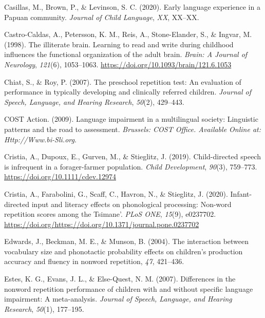 \documentclass[english,,man,floatsintext]{apa6}
\begin{document}
\leavevmode\hypertarget{ref-casillas2020early}{}%
Casillas, M., Brown, P., \& Levinson, S. C. (2020). Early language experience in a Papuan community. \emph{Journal of Child Language}, \emph{XX}, XX--XX.

\leavevmode\hypertarget{ref-castro1998illiterate}{}%
Castro-Caldas, A., Petersson, K. M., Reis, A., Stone-Elander, S., \& Ingvar, M. (1998). The illiterate brain. Learning to read and write during childhood influences the functional organization of the adult brain. \emph{Brain: A Journal of Neurology}, \emph{121}(6), 1053--1063. \url{https://doi.org/10.1093/brain/121.6.1053}

\leavevmode\hypertarget{ref-chiat2007preschool}{}%
Chiat, S., \& Roy, P. (2007). The preschool repetition test: An evaluation of performance in typically developing and clinically referred children. \emph{Journal of Speech, Language, and Hearing Research}, \emph{50}(2), 429--443.

\leavevmode\hypertarget{ref-is08042009language}{}%
COST Action. (2009). Language impairment in a multilingual society: Linguistic patterns and the road to assessment. \emph{Brussels: COST Office. Available Online at: Http://Www.bi-Sli.org}.

\leavevmode\hypertarget{ref-cristia2019child}{}%
Cristia, A., Dupoux, E., Gurven, M., \& Stieglitz, J. (2019). Child-directed speech is infrequent in a forager-farmer population. \emph{Child Development}, \emph{90}(3), 759--773. \url{https://doi.org/10.1111/cdev.12974}

\leavevmode\hypertarget{ref-cristia2020infant}{}%
Cristia, A., Farabolini, G., Scaff, C., Havron, N., \& Stieglitz, J. (2020). Infant-directed input and literacy effects on phonological processing: Non-word repetition scores among the Tsimane'. \emph{PLoS ONE}, \emph{15}(9), e0237702. \url{https://doi.org/https://doi.org/10.1371/journal.pone.0237702}

\leavevmode\hypertarget{ref-edwards2004interaction}{}%
Edwards, J., Beckman, M. E., \& Munson, B. (2004). The interaction between vocabulary size and phonotactic probability effects on children's production accuracy and fluency in nonword repetition, \emph{47}, 421--436.

\leavevmode\hypertarget{ref-estes2007differences}{}%
Estes, K. G., Evans, J. L., \& Else-Quest, N. M. (2007). Differences in the nonword repetition performance of children with and without specific language impairment: A meta-analysis. \emph{Journal of Speech, Language, and Hearing Research}, \emph{50}(1), 177--195.
\end{document}
